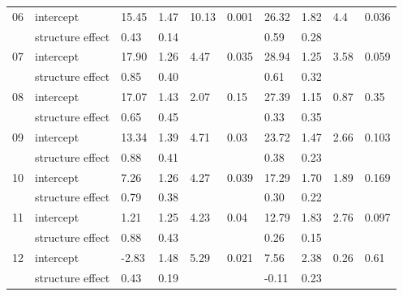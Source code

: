 \documentclass{article}
\begin{document}
\begin{table}[ht]
\begin{tabular}{|p{}|p{}|p{}p{}p{}p{}|p{}p{}p{}p{}|}
   \hline
06 & intercept & 15.45 & 1.47 & 10.13 & 0.001 & 26.32 & 1.82 & 4.4 & 0.036 \\ 
    & structure effect & 0.43 & 0.14 &  &  & 0.59 & 0.28 &  &  \\ 
   \hline
07 & intercept & 17.90 & 1.26 & 4.47 & 0.035 & 28.94 & 1.25 & 3.58 & 0.059 \\ 
    & structure effect & 0.85 & 0.40 &  &  & 0.61 & 0.32 &  &  \\ 
   \hline
08 & intercept & 17.07 & 1.43 & 2.07 & 0.15 & 27.39 & 1.15 & 0.87 & 0.35 \\ 
    & structure effect & 0.65 & 0.45 &  &  & 0.33 & 0.35 &  &  \\ 
   \hline
09 & intercept & 13.34 & 1.39 & 4.71 & 0.03 & 23.72 & 1.47 & 2.66 & 0.103 \\ 
    & structure effect & 0.88 & 0.41 &  &  & 0.38 & 0.23 &  &  \\ 
   \hline
10 & intercept & 7.26 & 1.26 & 4.27 & 0.039 & 17.29 & 1.70 & 1.89 & 0.169 \\ 
    & structure effect & 0.79 & 0.38 &  &  & 0.30 & 0.22 &  &  \\ 
   \hline
11 & intercept & 1.21 & 1.25 & 4.23 & 0.04 & 12.79 & 1.83 & 2.76 & 0.097 \\ 
    & structure effect & 0.88 & 0.43 &  &  & 0.26 & 0.15 &  &  \\ 
   \hline
12 & intercept & -2.83 & 1.48 & 5.29 & 0.021 & 7.56 & 2.38 & 0.26 & 0.61 \\ 
    & structure effect & 0.43 & 0.19 &  &  & -0.11 & 0.23 &  &  \\ 
   \hline
\end{tabular}
\endgroup
\end{table}\clearpage
\end{document}
